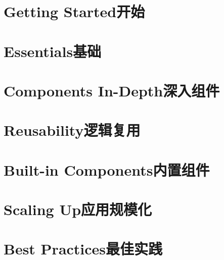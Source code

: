 \documentclass[oneside]{book}
\begin{document}
\chapter{Getting Started\hfill 开始}
 
 
\chapter{Essentials\hfill 基础}







 



 
 
\chapter{Components In-Depth\hfill 深入组件}
 
 
 





\chapter{Reusability\hfill 逻辑复用}



\chapter{Built-in Components\hfill 内置组件}


\chapter{Scaling Up\hfill 应用规模化}
\chapter{Best Practices\hfill 最佳实践}
\end{document}
